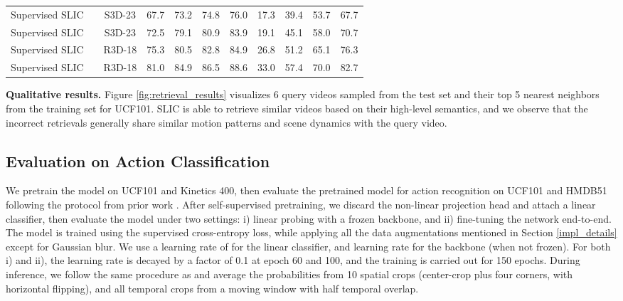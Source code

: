 \documentclass[10pt,twocolumn,letterpaper]{article}
\begin{document}
\begin{table*}[ht]
{\begin{tabu}{lcccccc | cccc }
    
\midrule
    \rowfont{\color{black}}

    Supervised SLIC &  & S3D-23 & 67.7 & 73.2 & 74.8 & 76.0 & 17.3 & 39.4 & 53.7 & 67.7\\
    Supervised SLIC &  & S3D-23 & 72.5 & 79.1 & 80.9 & 83.9 & 19.1 & 45.1 & 58.0 & 70.7\\
    
    Supervised SLIC &  & R3D-18 & 75.3 & 80.5 & 82.8 & 84.9 & 26.8 & 51.2 & 65.1 & 76.3 \\
    Supervised SLIC &  & R3D-18 & 81.0 & 84.9 & 86.5 & 88.6 & 33.0 & 57.4 & 70.0 & 82.7 \\
    
    \bottomrule
  \end{tabu}
  }
  \vspace{-0.5cm}
\end{table*}

\textbf{Qualitative results.} Figure \ref{fig:retrieval_results} visualizes 6 query videos sampled from the test set and their top 5 nearest neighbors from the training set for UCF101. SLIC is able to retrieve similar videos based on their high-level semantics, and we observe that the incorrect retrievals generally share similar motion patterns and scene dynamics with the query video.

\subsection{Evaluation on Action Classification}
\vspace{-0.1cm}

We pretrain the model on UCF101 and Kinetics 400, then evaluate the pretrained model for action recognition on UCF101 and HMDB51 following the protocol from prior work \cite{coclr}. After self-supervised pretraining, we discard the non-linear projection head and attach a linear classifier, then evaluate the model under two settings: i) linear probing with a frozen backbone, and ii) fine-tuning the network end-to-end. The model is trained using the supervised cross-entropy loss, while applying all the data augmentations mentioned in Section \ref{impl_details} except for Gaussian blur. We use a learning rate of  for the linear classifier, and  learning rate for the backbone (when not frozen). For both i) and ii), the learning rate is decayed by a factor of 0.1 at epoch 60 and 100, and the training is carried out for 150 epochs. During inference, we follow the same procedure as \cite{coclr, Han20} and average the probabilities from 10 spatial crops (center-crop plus four corners, with horizontal flipping), and all temporal crops from a moving window with half temporal overlap. 
\end{document}
